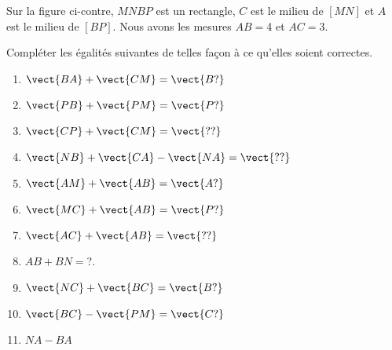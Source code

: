 
\begin{exercice}\label{exosmath-0221}

    \begin{multicols}{2}
        Sur la figure ci-contre, \( MNBP\) est un rectangle, \( C\) est le milieu de \( [MN]\) et $A$ est le milieu de \( [BP]\). Nous avons les mesures \( AB=\)\unit{4}{\centi\meter} et \( AC=\)\unit{3}{\centi\meter}.

    \columnbreak


    \begin{center}

    \end{center}

    \end{multicols}
    Compléter les égalités suivantes de telles façon à ce qu'elles soient correctes.
    \begin{multicols}{3}
        \begin{enumerate}
            \item
                \( \vect{ BA }+\vect{ CM }=\vect{ B? }\) 
            \item
                \( \vect{ PB }+\vect{ PM }=\vect{ P? }\)
            \item
                \( \vect{ CP }+\vect{ CM }=\vect{ ?? }\)
            \item
                \( \vect{ NB }+\vect{ CA }-\vect{ NA }=\vect{ ?? }\)
            \item
                \( \vect{ AM }+\vect{ AB }=\vect{ A? }\)
            \item
                \( \vect{ MC }+\vect{ AB }=\vect{ P? }\)
            \item
                \( \vect{ AC }+\vect{ AB }=\vect{ ?? }\)
            \item
                \( AB+BN=\)\unit{?}{\centi\meter}.
            \item
                \( \vect{ NC }+\vect{ BC }=\vect{ B? }\)
            \item
                \( \vect{ BC }-\vect{ PM }=\vect{ C? }\)
            \item
                \( NA-BA\)
        \end{enumerate}
    \end{multicols}

\end{exercice}
